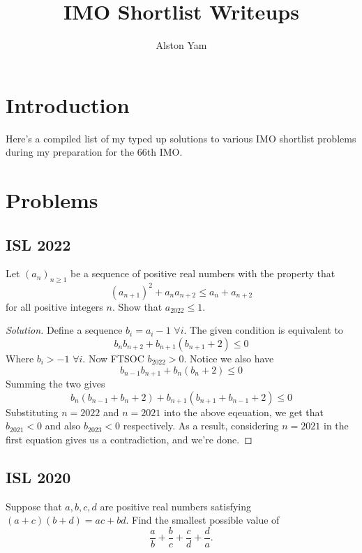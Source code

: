 \documentclass{article}
\title{IMO Shortlist Writeups}
\author{Alston Yam}
\theoremstyle{mytheoremstyle}
\theoremstyle{mytheoremstyle}
\theoremstyle{myproblemstyle}
\begin{document}
    \maketitle
    \section{Introduction}
    Here's a compiled list of my typed up solutions to various IMO shortlist problems during my preparation for the 66th IMO.
    
    \section{Problems}
    \subsection{ISL 2022}

    \begin{problem}[2022 A1]
        Let $(a_n)_{n\geq 1}$ be a sequence of positive real numbers with the property that
            \[ (a_{n+1})^2 + a_na_{n+2} \leq a_n + a_{n+2} \]
        for all positive integers $n$. Show that $a_{2022}\leq 1$.
    \end{problem}

    \begin{proof}[Solution]
        Define a sequence $b_i = a_i - 1$ $\forall i$. The given condition is equivalent to \[b_nb_{n+2} + b_{n+1}(b_{n+1} + 2) \leq 0\]
        Where $b_i > -1$ $\forall i$. Now FTSOC $b_{2022} > 0$. Notice we also have \[b_{n-1}b_{n+1} + b_{n}(b_{n} + 2) \leq 0\]
        Summing the two gives
        \[b_n(b_{n-1} + b_n + 2) + b_{n+1}(b_{n+1} + b_{n-1} + 2)\leq 0\]
        Substituting $n=2022$ and $n=2021$ into the above eqeuation, we get that $b_{2021} < 0$ and also $b_{2023} < 0$ respectively. As a result, considering $n=2021$ in the first equation gives us a contradiction, and we're done.
    \end{proof}

    \subsection{ISL 2020}

    \begin{problem}[2020 A3]
        Suppose that $a,b,c,d$ are positive real numbers satisfying $(a+c)(b+d)=ac+bd$. Find the smallest possible value of
        \[ \frac{a}{b}+\frac{b}{c}+\frac{c}{d}+\frac{d}{a}. \]
    \end{problem}
\end{document}
